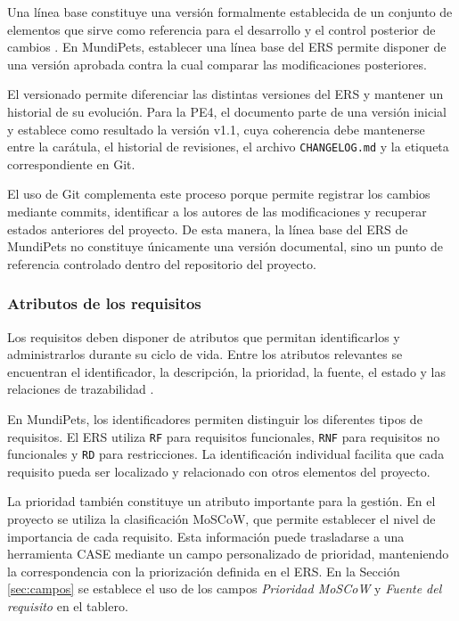 \documentclass[journal,onecolumn]{IEEEtran}
\begin{document}
	Una línea base constituye una versión formalmente establecida de un conjunto de elementos que
	sirve como referencia para el desarrollo y el control posterior de cambios \cite{iso15288}. En
	MundiPets, establecer una línea base del ERS permite disponer de una versión aprobada contra la
	cual comparar las modificaciones posteriores.
	
	El versionado permite diferenciar las distintas versiones del ERS y mantener un historial de su
	evolución. Para la PE4, el documento parte de una versión inicial y establece como resultado la
	versión v1.1, cuya coherencia debe mantenerse entre la carátula, el historial de revisiones, el
	archivo \texttt{CHANGELOG.md} y la etiqueta correspondiente en Git.
	
	El uso de Git complementa este proceso porque permite registrar los cambios mediante commits,
	identificar a los autores de las modificaciones y recuperar estados anteriores del proyecto. De
	esta manera, la línea base del ERS de MundiPets no constituye únicamente una versión documental,
	sino un punto de referencia controlado dentro del repositorio del proyecto.
	
	\subsubsection{Atributos de los requisitos}
	
	Los requisitos deben disponer de atributos que permitan identificarlos y administrarlos durante su
	ciclo de vida. Entre los atributos relevantes se encuentran el identificador, la descripción, la
	prioridad, la fuente, el estado y las relaciones de trazabilidad \cite{wiegers2013}.
	
	En MundiPets, los identificadores permiten distinguir los diferentes tipos de requisitos. El ERS
	utiliza \texttt{RF} para requisitos funcionales, \texttt{RNF} para requisitos no funcionales y
	\texttt{RD} para restricciones. La identificación individual facilita que cada requisito pueda ser
	localizado y relacionado con otros elementos del proyecto.
	
	La prioridad también constituye un atributo importante para la gestión. En el proyecto se utiliza
	la clasificación MoSCoW, que permite establecer el nivel de importancia de cada requisito. Esta
	información puede trasladarse a una herramienta CASE mediante un campo personalizado de prioridad,
	manteniendo la correspondencia con la priorización definida en el ERS. En la Sección
	\ref{sec:campos} se establece el uso de los campos \emph{Prioridad MoSCoW} y \emph{Fuente del
		requisito} en el tablero.
	
\end{document}
